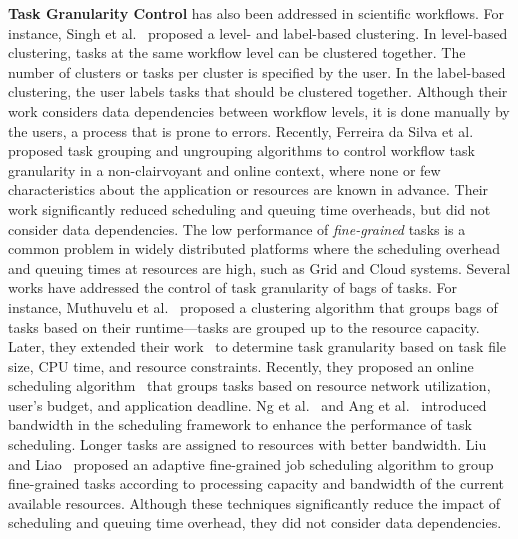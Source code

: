 \textbf{Task Granularity Control} has also been addressed in scientific workflows. For instance, Singh et al.~\cite{Singh2008} proposed a level- and label-based clustering. In level-based clustering, tasks at the same workflow level can be clustered together. The number of clusters or tasks per cluster is specified by the user. In the label-based clustering, the user labels tasks that should be clustered together. Although their work considers data dependencies between workflow levels, it is done manually by the users, a process that is prone to errors. Recently, Ferreira da Silva et al.~\cite{Ferreira-granularity-2013} proposed task grouping and ungrouping algorithms to control workflow task granularity in a non-clairvoyant and online context, where none or few characteristics about the application or resources are known in advance. Their work significantly reduced scheduling and queuing time overheads, but did not consider data dependencies. The low performance of \emph{fine-grained} tasks is a common problem in widely distributed platforms where the scheduling overhead and queuing times at resources are high, such as Grid and Cloud systems. Several works have addressed the control of task granularity of bags of tasks. For instance, Muthuvelu et al.~\cite{Muthuvelu2005} proposed a clustering algorithm that groups bags of tasks based on their runtime---tasks are grouped up to the resource capacity. Later, they extended their work~\cite{4493929} to determine task granularity based on task file size, CPU time, and resource constraints. Recently, they proposed an online scheduling algorithm~\cite{Muthuvelu2010,Muthuvelu2013} that groups tasks based on resource network utilization, user's budget, and application deadline. Ng et al.~\cite{Keat2006} and Ang et al.~\cite{Ang2009} introduced bandwidth in the scheduling framework to enhance the performance of task scheduling. Longer tasks are assigned to resources with better bandwidth. Liu and Liao~\cite{Liu2009} proposed an adaptive fine-grained job scheduling algorithm to group fine-grained tasks according to processing capacity and bandwidth of the current available resources. Although these techniques significantly reduce the impact of scheduling and queuing time overhead, they did not consider data dependencies.


